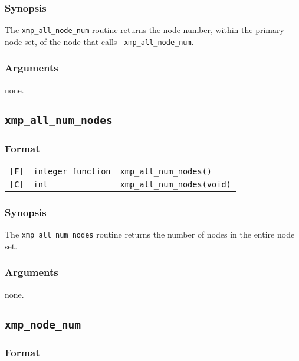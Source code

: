 \subsubsection*{Synopsis}

     The {\tt xmp\_all\_node\_num} routine returns the node number,
     within the primary node set, of the node that calls {\tt
     xmp\_all\_node\_num}.

\subsubsection*{Arguments}

    none.


\subsection{\tt xmp\_all\_num\_nodes}

\subsubsection*{Format}

\begin{tabular}{lll}

\verb![F]!&  {\tt integer function}& {\tt xmp\_all\_num\_nodes()}\\

\verb![C]!&  {\tt int}& {\tt xmp\_all\_num\_nodes(void)}

\end{tabular}

\subsubsection*{Synopsis}

     The {\tt xmp\_all\_num\_nodes} routine returns the number of nodes
     in the entire node set.

\subsubsection*{Arguments}

    none.


\subsection{\tt xmp\_node\_num}

\subsubsection*{Format}


